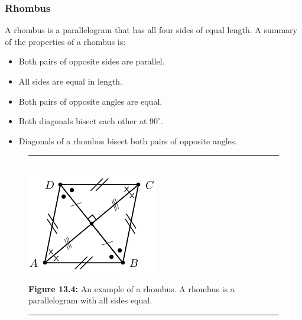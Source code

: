 \subsubsection{ Rhombus}
A rhombus is a parallelogram that has all four sides of equal length. A summary
of the properties of a rhombus is:\par 
\begin{itemize}[noitemsep]
\item Both pairs of opposite sides are parallel.
\item All sides are equal in length.
\item Both pairs of opposite angles are equal.
\item Both diagonals bisect each other at ${90}^{\circ }$.
\item Diagonals of a rhombus bisect both pairs of opposite angles.
\end{itemize}
\setcounter{subfigure}{0}
\begin{figure}[H] %
\begin{center}
\rule[.1in]{\figurerulewidth}{.005in} \\
\label{m39354*uid75!!!underscore!!!media}\label{
m39354*uid75!!!underscore!!!printimage}\includegraphics{
col11306.imgs/m39354_MG10C13_043.png} %
\vspace{2pt}
\vspace{\rubberspace}\par \begin{cnxcaption}
\small \textbf{Figure 13.4: }An example of a rhombus. A rhombus is a
parallelogram with all sides equal.
\end{cnxcaption}
\vspace{.1in}
\rule[.1in]{\figurerulewidth}{.005in} \\
\end{center}
\end{figure}       

